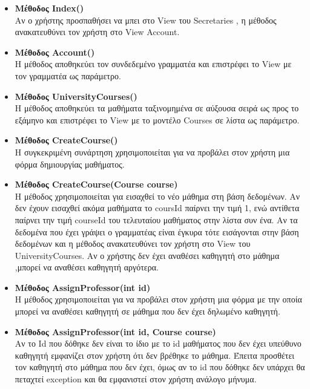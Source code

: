 \documentclass[12pt]{article}
\begin{document}
\begin{itemize}
	
	\item \textbf{Μέθοδος Index()}\\
	Αν ο χρήστης προσπαθήσει να μπει στο View του Secretaries , η μέθοδος ανακατευθύνει τον χρήστη στο View Account.		
	
	\item \textbf{Μέθοδος Account()}\\
	Η μέθοδος αποθηκεύει τον συνδεδεμένο γραμματέα και επιστρέφει το View με τον γραμματέα ως παράμετρο.		
	
	\item \textbf{Μέθοδος UniversityCourses()}\\
	Η μέθοδος αποθηκεύει τα μαθήματα ταξινομημένα σε αύξουσα σειρά ως προς το εξάμηνο και επιστρέφει το View με το μοντέλο Courses σε λίστα ως παράμετρο.		
		
	\item \textbf{Μέθοδος CreateCourse()}\\
	Η συγκεκριμένη συνάρτηση χρησιμοποιείται για να προβάλει στον χρήστη μια φόρμα δημιουργίας μαθήματος.

	\item \textbf{Μέθοδος CreateCourse(Course course)}\\
	Η μέθοδος χρησιμοποιείται για εισαχθεί το νέο μάθημα στη βάση δεδομένων. Αν δεν έχουν εισαχθεί ακόμα μαθήματα το coursId παίρνει την τιμή 1, ενώ αντίθετα παίρνει την τιμή courseId του τελευταίου μαθήματος στην λίστα συν ένα. Αν τα δεδομένα που έχει γράψει ο γραμματέας είναι έγκυρα τότε εισάγονται στην βάση δεδομένων και η μέθοδος ανακατευθύνει τον χρήστη στο View του UniversityCourses. Αν ο χρήστης δεν έχει αναθέσει καθηγητή στο μάθημα ,μπορεί να αναθέσει καθηγητή αργότερα.		
	
	\item \textbf{Μέθοδος AssignProfessor(int id)}\\
	Η μέθοδος χρησιμοποιείται για να προβάλει στον χρήστη μια φόρμα με την οποία μπορεί να αναθέσει καθηγητή σε μάθημα που δεν έχει δηλωμένο καθηγητή.				

	\item \textbf{Μέθοδος AssignProfessor(int id, Course course)}\\
	Αν το Id που δόθηκε δεν είναι το ίδιο με το id μαθήματος που δεν έχει υπεύθυνο καθηγητή  εμφανίζει στον χρήστη ότι δεν βρέθηκε το μάθημα. Έπειτα προσθέτει τον καθηγητή στο μάθημα που δεν έχει, όμως αν το id που δόθηκε δεν υπάρχει θα πεταχτεί exception και θα εμφανιστεί στον χρήστη ανάλογο μήνυμα.


\end{itemize}
\end{document}
